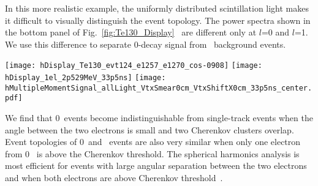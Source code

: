 In this more realistic example, the uniformly distributed
scintillation light makes it difficult to visually distinguish
the event topology. The power spectra shown in the bottom panel of
Fig.~\ref{fig:Te130_Display}~ are different only at $l$=0 and
$l$=1. We use this difference to separate 0\nbb-decay
signal from \B~background events.

\begin{figure*}[hb]
  \centering
  \texttt{[image: hDisplay\_Te130\_evt124\_e1257\_e1270\_cos-0908]}
  \texttt{[image: hDisplay\_1el\_2p529MeV\_33p5ns]}
  \texttt{[image: hMultipleMomentSignal\_allLight\_VtxSmear0cm\_VtxShiftX0cm\_33p5ns\_center.pdf]} 
  \caption{\emph{Top panels:} Event displays with multiple scattering
and at the center of the detector for: (\emph{top left}) a signal
event with two 1.26~MeV back-to-back electrons; and (\emph{top right
})a \B-neutrino background event with a single 2.53~MeV electron. The
model QE's are assumed for both Cherenkov photons (triangles) and
scintillation photons (dots).  \emph{Bottom panel:} The normalized
power spectrum $S_l$ for the Cherenkov photons, calculated
event-by-event for 1000 events of each of the two above topologies. The
heights of the rectangular boxes correspond to a 63\% C.L.
$(\pm 1 ~\sigma)$.}
\label{fig:Te130_Display}
\end{figure*}

We find that 0\nbb~events become indistinguishable from single-track events when
the angle between the two electrons is small and two Cherenkov
clusters overlap. Event topologies of 0\nbb~and \B~events are also
very similar when only one electron from 0\nbb~ is above the Cherenkov
threshold. The spherical harmonics analysis is most efficient
for events with large angular separation between the two electrons and
when both electrons are above Cherenkov threshold~\cite{further_cuts}.



